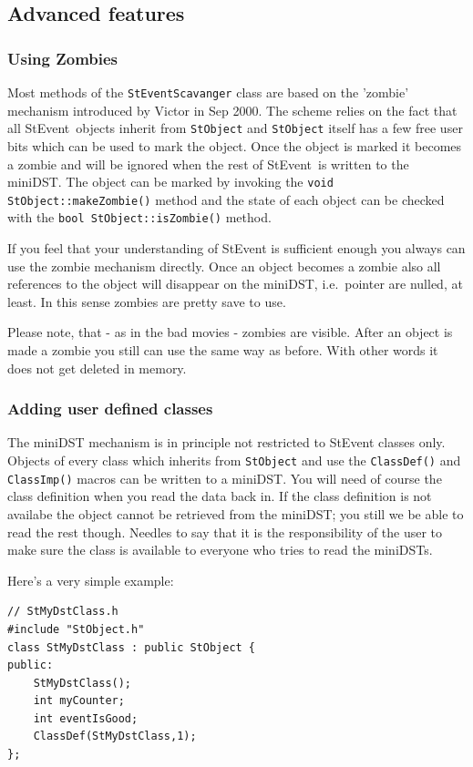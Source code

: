 \documentclass[twoside]{article}
\newcommand{\StEvent}{\textsf{StEvent}}
\begin{document}
\subsection{Advanced features}
\subsubsection{Using Zombies}
Most methods of the  \texttt{StEventScavanger} class are based on the 'zombie' mechanism
introduced by Victor in Sep 2000.
The scheme relies on the fact that all \StEvent\ objects inherit from \texttt{StObject}
and \texttt{StObject} itself has a few free user bits which can be used to mark the object.
Once the object is marked it becomes a zombie and will be ignored when the rest of
\StEvent\ is written to the miniDST. The object can be marked by invoking the
\texttt{void StObject::makeZombie()} method and the state of each object can be
checked with the \texttt{bool StObject::isZombie()} method.

If you feel that your understanding of StEvent is sufficient enough you always can use
the zombie mechanism directly. Once an object becomes a zombie also all references to the
object will disappear on the miniDST, i.e.~pointer are nulled, at least. In this sense
zombies are pretty save to use.

Please note, that - as in the bad movies - zombies are visible. After an object is made
a zombie you still can use the same way as before. With other words it does not get deleted
in memory.

\subsubsection{Adding user defined classes}

The miniDST mechanism is in principle not restricted to StEvent
classes only.  Objects of every class which inherits from
\texttt{StObject} and use the \texttt{ClassDef()} and
\texttt{ClassImp()} macros can be written to a miniDST. You
will need of course the class definition when you read the data back
in. If the class definition is not availabe the object cannot be
retrieved from the miniDST; you still we be able to read the rest though.
Needles to say that it is the responsibility of the user to
make sure the class is available to everyone who tries to read the
miniDSTs.

Here's a very simple example:
\begin{verbatim}
// StMyDstClass.h
#include "StObject.h"
class StMyDstClass : public StObject {
public:
    StMyDstClass();
    int myCounter;
    int eventIsGood;
    ClassDef(StMyDstClass,1);
};
\end{verbatim}
\end{document}
